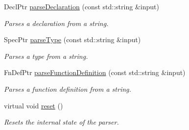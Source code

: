 \begin{DoxyCompactItemize}
Decl\-Ptr \hyperlink{classgiskard__suturo_1_1GiskardPPParser_a1394719bacd4e8b95ea8dc285b5832a5}{parse\-Declaration} (const std\-::string \&input)
\begin{DoxyCompactList}\small\item\em Parses a declaration from a string. \end{DoxyCompactList}\item 
Spec\-Ptr \hyperlink{classgiskard__suturo_1_1GiskardPPParser_ae18049f559432fef1008a7e4a4acbe52}{parse\-Type} (const std\-::string \&input)
\begin{DoxyCompactList}\small\item\em Parses a type from a string. \end{DoxyCompactList}\item 
Fn\-Def\-Ptr \hyperlink{classgiskard__suturo_1_1GiskardPPParser_a54d108fb57763f43f24a84655fa3ec54}{parse\-Function\-Definition} (const std\-::string \&input)
\begin{DoxyCompactList}\small\item\em Parses a function definition from a string. \end{DoxyCompactList}\item 
\hypertarget{classgiskard__suturo_1_1GiskardPPParser_a7fa67ff0d0eb84f8d368ee78c4619325}{virtual void \hyperlink{classgiskard__suturo_1_1GiskardPPParser_a7fa67ff0d0eb84f8d368ee78c4619325}{reset} ()}\label{classgiskard__suturo_1_1GiskardPPParser_a7fa67ff0d0eb84f8d368ee78c4619325}

\begin{DoxyCompactList}\small\item\em Resets the internal state of the parser. \end{DoxyCompactList}\end{DoxyCompactItemize}
